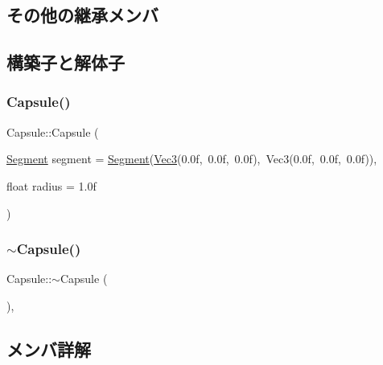 \subsection*{その他の継承メンバ}


\subsection{構築子と解体子}
\mbox{\label{class_capsule_aeef9aff581e55f6b091854c3ca9a8a8d}} 
\subsubsection{\texorpdfstring{Capsule()}{Capsule()}}
{\footnotesize\ttfamily Capsule\+::\+Capsule (\begin{DoxyParamCaption}\item[{\mbox{\hyperlink{class_segment}{Segment}}}]{segment = {\ttfamily \mbox{\hyperlink{class_segment}{Segment}}(\mbox{\hyperlink{_vector3_d_8h_ab16f59e4393f29a01ec8b9bbbabbe65d}{Vec3}}(0.0f,~0.0f,~0.0f),~Vec3(0.0f,~0.0f,~0.0f))},  }\item[{float}]{radius = {\ttfamily 1.0f} }\end{DoxyParamCaption})\hspace{0.3cm}{\ttfamily [inline]}}

\mbox{\label{class_capsule_abfd7f0348ce8e7f8ee4e70374ae27533}} 
\subsubsection{\texorpdfstring{$\sim$\+Capsule()}{~Capsule()}}
{\footnotesize\ttfamily Capsule\+::$\sim$\+Capsule (\begin{DoxyParamCaption}{ }\end{DoxyParamCaption})\hspace{0.3cm}{\ttfamily [inline]}, {\ttfamily [virtual]}}



\subsection{メンバ詳解}
\mbox{\label{class_capsule_a7b7f46d36a0d810555aa5eb62da6a8ed}} 

